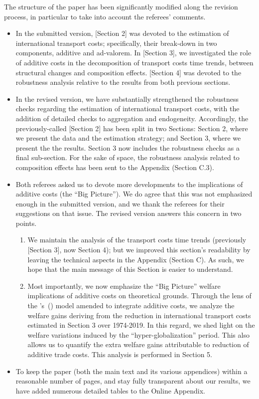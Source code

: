 \documentclass[a4paper,11pt]{article}
\newcommand\cites[1]{\citeauthor{#1}'s\ (\citeyear{#1})}
\begin{document}
The structure of the paper has been significantly modified along the revision process, in particular to take into account the referees' comments.
\begin{itemize}
	\item In the submitted version, [Section 2] was devoted to the estimation of international transport costs; specifically, their break-down in two components, additive and ad-valorem. In [Section 3], we investigated the role of additive costs in the decomposition of transport costs time trends, between structural changes and composition effects. [Section 4] was devoted to the robustness analysis relative to the results from both previous sections.
	\item In the revised version, we have substantially strengthened the robustness checks regarding the estimation of international transport costs, with the addition of detailed checks to aggregation and endogeneity. Accordingly, the previously-called [Section 2] has been split in two Sections: Section 2, where we present the data and the estimation strategy; and Section 3, where we present the the results. Section 3 now includes the robustness checks as a final sub-section. For the sake of space, the robustness analysis related to composition effects has been sent to the Appendix (Section C.3).
	\item Both referees asked us to devote more developments to the implications of additive costs (the ``Big Picture''). We do agree that this was not emphasized enough in the submitted version, and we thank the referees for their suggestions on that issue. The revised version answers this concern in two points.
	\begin{enumerate}
		\item We maintain the analysis of the transport costs time trends (previously [Section 3], now Section 4); but we improved this section's readability by leaving the technical aspects in the Appendix (Section C). As such, we hope that the main message of this Section is easier to understand.
		\item Most importantly, we now emphasize the ``Big Picture'' welfare implications of additive costs on theoretical grounds. Through the lens of the \cites{melitz} model amended to integrate additive costs, we analyze the welfare gains deriving from the reduction in international transport costs estimated in Section 3 over 1974-2019. In this regard, we shed light on the welfare variations induced by the ``hyper-globalization'' period. This also allows us to quantify the extra welfare gains attributable to reduction of additive trade costs. This analysis is performed in Section 5.


	\end{enumerate}
	\item To keep the paper (both the main text and its various appendices) within a reasonable number of pages, and stay fully transparent about our results, we have added numerous detailed tables to the Online Appendix.
\end{itemize}
\end{document}

